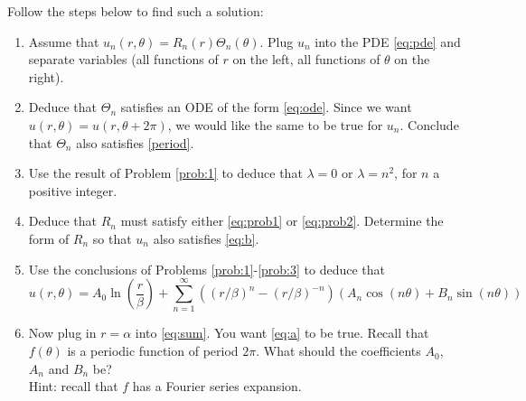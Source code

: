 \documentclass[11pt]{article}
\renewcommand{\a}{\alpha}
\renewcommand{\b}{\beta}
\renewcommand{\l}{\lambda}
\renewcommand{\th}{\theta}
\begin{document}
 \label{a}Follow the steps below to find such a solution:
 \begin{enumerate}
     \item Assume that $u_n(r,\th)=R_n(r)\Theta_n(\th)$. Plug $u_n$ into the PDE \eqref{eq:pde} and separate variables (all functions of $r$ on the left, all functions of $\th$ on the right).
     \item Deduce that $\Theta_n $ satisfies an ODE of the form \eqref{eq:ode}.
     Since we want $u(r,\theta)=u(r,\theta+2\pi)$, we would like the same to be true for $u_n$.
     Conclude that $\Theta_n$ also satisfies \eqref{period}.

     \item Use the result of Problem \ref{prob:1} to deduce that $\l=0$ or $\l=n^2$, for $n$ a positive integer.

     \item Deduce that $R_n$ must satisfy either \eqref{eq:prob1} or \eqref{eq:prob2}.
     Determine the form of $R_n$ so that $u_n$ also satisfies \eqref{eq:b}.

     \item Use the conclusions of Problems \ref{prob:1}-\ref{prob:3} to deduce that
     \begin{equation}\label{eq:sum}
         u(r,\theta)=A_0\ln \left(\frac{r}{\b}\right)+\sum_{n=1}^\infty \left( (r/\b)^n-(r/\b)^{-n}\right)(A_n\cos(n\th)+B_n\sin(n\th))
     \end{equation}

     \item Now plug in $r=\a$ into \eqref{eq:sum}. You want \eqref{eq:a} to be true.
     Recall that $f(\theta)$ is a periodic function of period $2\pi$.
     What should the coefficients $A_0$, $A_n$ and $B_n$ be?\\
     Hint: recall that $f$ has a Fourier series expansion.
 \end{enumerate}
\end{document}
